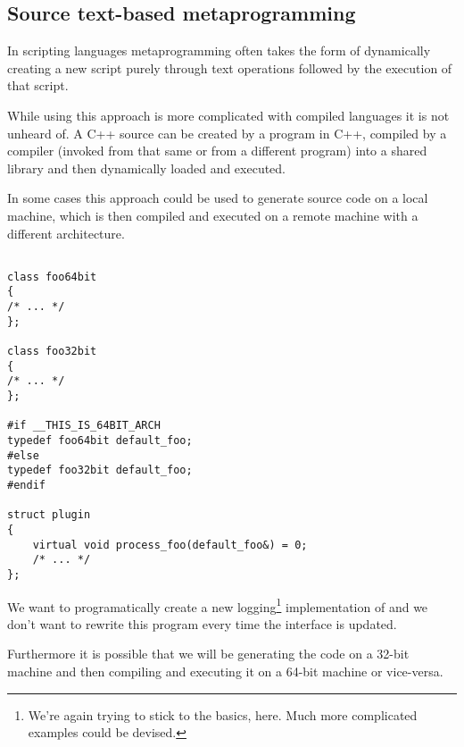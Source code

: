 \subsection{Source text-based metaprogramming}

In scripting languages metaprogramming often takes the form of dynamically creating
a new script purely through text operations followed by the execution of that script.

While using this approach is more complicated with compiled languages it is not
unheard of. A C++ source can be created by a program in C++, compiled by a compiler
(invoked from that same or from a different program) into a shared library and then
dynamically loaded and executed.

In some cases this approach could be used to generate source code on a local machine,
which is then compiled and executed on a remote machine with a different architecture.

\begin{verbatim}

class foo64bit
{
/* ... */
};

class foo32bit
{
/* ... */
};

#if __THIS_IS_64BIT_ARCH
typedef foo64bit default_foo;
#else
typedef foo32bit default_foo;
#endif

struct plugin
{
	virtual void process_foo(default_foo&) = 0;
	/* ... */
};

\end{verbatim}

We want to programatically create a new logging\footnote{
We're again trying to stick to the basics, here. Much more complicated
examples could be devised.
} implementation of \verb@plugin@
and we don't want to rewrite this program every time
the interface is updated.

Furthermore it is possible that we will be generating the code
on a 32-bit machine and then compiling and executing it on a 64-bit machine
or vice-versa.

